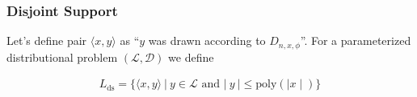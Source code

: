 \begin{frame}
    \frametitle{Disjoint Support}

    Let's define pair $\langle x, y \rangle$ as ``$y$ was drawn according to $D_{n,x,\phi}$''.
    For a parameterized distributional problem $(\mathcal{L}, \mathcal{D})$ we define


    \begin{align*}
        L_{\text{ds}} = \{\langle x, y \rangle \: \vert \: y \in \mathcal{L} \text{ and } \vert \: y \: \vert \leq \text{poly}(\mid x\mid)\}
    \end{align*}

\end{frame}